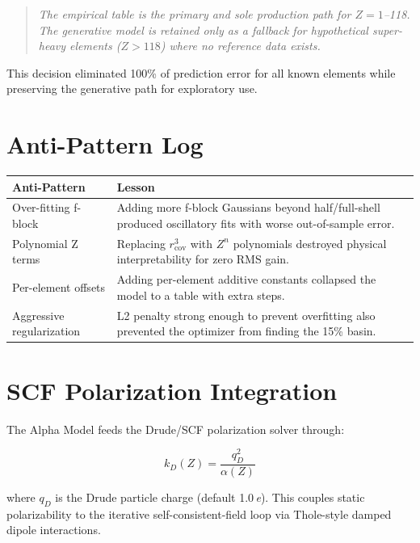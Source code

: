 \documentclass[11pt,a4paper]{article}
\begin{document}
\begin{quote}
\itshape
The empirical table is the primary and sole production path for
$Z = 1$--118.  The generative model is retained only as a fallback for
hypothetical super-heavy elements ($Z > 118$) where no reference data
exists.
\end{quote}

This decision eliminated 100\% of prediction error for all known elements
while preserving the generative path for exploratory use.

\section{Anti-Pattern Log}

\begin{center}
\begin{tabular}{lp{7cm}}
\toprule
\textbf{Anti-Pattern} & \textbf{Lesson} \\
\midrule
Over-fitting f-block & Adding more f-block Gaussians beyond half/full-shell
  produced oscillatory fits with worse out-of-sample error. \\
Polynomial Z terms & Replacing $r_\mathrm{cov}^3$ with $Z^n$ polynomials
  destroyed physical interpretability for zero RMS gain. \\
Per-element offsets & Adding per-element additive constants collapsed the
  model to a table with extra steps. \\
Aggressive regularization & L2 penalty strong enough to prevent overfitting
  also prevented the optimizer from finding the 15\% basin. \\
\bottomrule
\end{tabular}
\end{center}

\section{SCF Polarization Integration}

The Alpha Model feeds the Drude/SCF polarization solver through:

\begin{equation}
  k_D(Z) = \frac{q_D^2}{\alpha(Z)}
\end{equation}

\noindent where $q_D$ is the Drude particle charge (default 1.0\,\textit{e}).
This couples static polarizability to the iterative self-consistent-field
loop via Thole-style damped dipole interactions.
\end{document}
